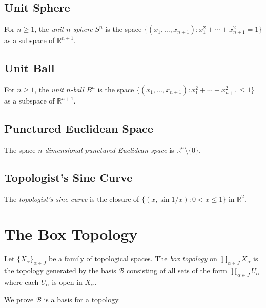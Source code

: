 \subsection{Unit Sphere}

\begin{df}
  For $n \geq 1$, the \emph{unit $n$-sphere} $S^n$ is the space $\{ (x_1, \ldots, x_{n+1}) : x_1^2 + \cdots + x_{n+1}^2 = 1 \}$ as a subspace of $\mathbb{R}^{n+1}$.
\end{df}

\subsection{Unit Ball}

\begin{df}
  For $n \geq 1$, the \emph{unit $n$-ball} $B^n$ is the space $\{ (x_1, \ldots, x_{n+1}) : x_1^2 + \cdots + x_{n+1}^2 \leq 1 \}$ as a subspace of $\mathbb{R}^{n+1}$.
\end{df}

\subsection{Punctured Euclidean Space}

\begin{df}
  The space \emph{$n$-dimensional punctured Euclidean space} is $\mathbb{R}^n \setminus \{ 0 \}$.
\end{df}

\subsection{Topologist's Sine Curve}

\begin{df}
  The \emph{topologist's sine curve} is the closure of $\{ (x, \sin 1/x) : 0 < x \leq 1 \}$ in $\mathbb{R}^2$.
\end{df}

\section{The Box Topology}

\begin{df}
  Let $\{ X_\alpha \}_{\alpha \in J}$ be a family of topological spaces. The \emph{box topology} on $\prod_{\alpha \in J} X_\alpha$ is the topology generated by the basis $\mathcal{B}$ consisting of all sets of the form $\prod_{\alpha \in J} U_\alpha$ where each $U_\alpha$ is open in $X_\alpha$.

  We prove $\mathcal{B}$ is a basis for a topology.
\end{df}

